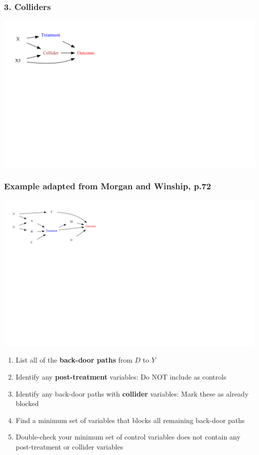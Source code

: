 \documentclass[xcolor=x11names,compress]{beamer}\usepackage[]{graphicx}\usepackage[]{color}
\newenvironment{knitrout}{}{} %
\renewcommand{\(}{\begin{columns}}
\renewcommand{\)}{\end{columns}}
\newcommand{\<}[1]{\begin{column}{#1}}
\renewcommand{\>}{\end{column}}
\begin{document}
\begin{frame}
\frametitle{3. Colliders}
\begin{knitrout}
\color{fgcolor}
\includegraphics[width=2.7\linewidth]{figure/Dag5b-1} 

\end{knitrout}
\end{frame}

\begin{frame}
\frametitle{Example adapted from Morgan and Winship, p.72}
\begin{knitrout}
\color{fgcolor}
\includegraphics[width=2.4\linewidth]{figure/Dag5_eg-1} 

\end{knitrout}
\begin{enumerate}
\footnotesize
\item List all of the \textbf{back-door paths} from $D$ to $Y$
\pause
\item Identify any \textbf{post-treatment} variables: Do NOT include as controls
\pause
\item Identify any back-door paths with \textbf{collider} variables: Mark these as already blocked
\pause
\item Find a minimum set of variables that blocks all remaining back-door paths
\pause
\item Double-check your minimum set of control variables does not contain any post-treatment or collider variables
\end{enumerate}
\normalsize
\end{frame}
\end{document}

